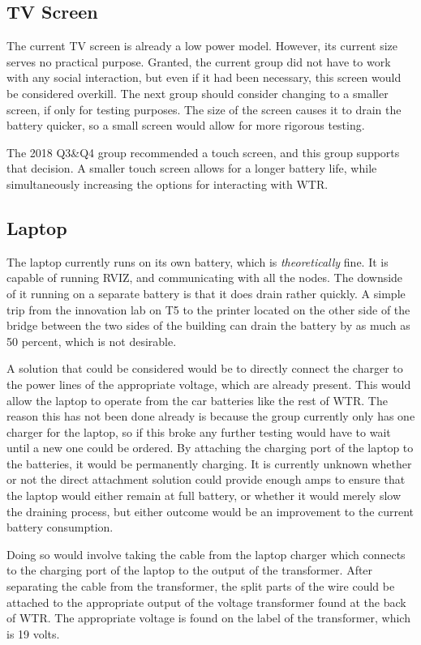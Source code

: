 \subsection{TV Screen}
The current TV screen is already a low power model.
However, its current size serves no practical purpose.
Granted, the current group did not have to work with any social interaction, but even if it had been necessary, this screen would be considered overkill.
The next group should consider changing to a smaller screen, if only for testing purposes.
The size of the screen causes it to drain the battery quicker, so a small screen would allow for more rigorous testing.

The 2018 Q3\&Q4 group recommended a touch screen, and this group supports that decision.
A smaller touch screen allows for a longer battery life, while simultaneously increasing the options for interacting with WTR.

\subsection{Laptop}
The laptop currently runs on its own battery, which is \textit{theoretically} fine.
It is capable of running RVIZ, and communicating with all the nodes.
The downside of it running on a separate battery is that it does drain rather quickly.
A simple trip from the innovation lab on T5 to the printer located on the other side of the bridge between the two sides of the building can drain the battery by as much as 50 percent, which is not desirable.



A solution that could be considered would be to directly connect the charger to the power lines of the appropriate voltage, which are already present.
This would allow the laptop to operate from the car batteries like the rest of WTR.
The reason this has not been done already is because the group currently only has one charger for the laptop, so if this broke any further testing would have to wait until a new one could be ordered.
By attaching the charging port of the laptop to the batteries, it would be permanently charging.
It is currently unknown whether or not the direct attachment solution could provide enough amps to ensure that the laptop would either remain at full battery, or whether it would merely slow the draining process, but either outcome would be an improvement to the current battery consumption.

Doing so would involve taking the cable from the laptop charger which connects to the charging port of the laptop to the output of the transformer.
After separating the cable from the transformer, the split parts of the wire could be attached to the appropriate output of the voltage transformer found at the back of WTR.
The appropriate voltage is found on the label of the transformer, which is 19 volts.

